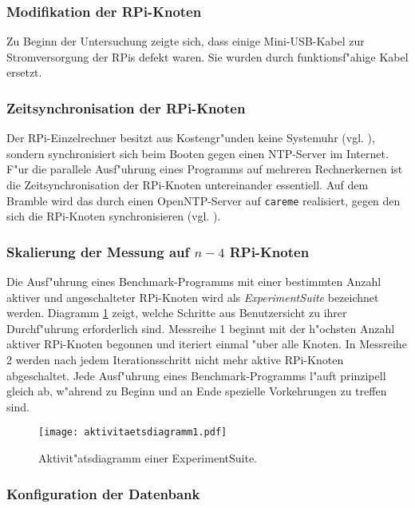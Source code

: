 \subsubsection{Modifikation der RPi-Knoten}

Zu Beginn der Untersuchung zeigte sich, dass einige Mini-USB-Kabel zur Stromversorgung der RPis defekt waren. Sie wurden durch funktionsf"ahige Kabel ersetzt. 

\subsubsection{Zeitsynchronisation der RPi-Knoten} 

Der RPi-Einzelrechner besitzt aus Kostengr"unden keine Systemuhr (vgl. \cite{schmi13}), sondern synchronisiert sich beim Booten gegen einen NTP-Server im Internet. F"ur die parallele Ausf"uhrung eines Programms auf mehreren Rechnerkernen ist die Zeitsynchronisation der RPi-Knoten untereinander essentiell. Auf dem Bramble wird das durch einen OpenNTP-Server auf \texttt{careme} realisiert, gegen den sich die RPi-Knoten synchronisieren (vgl. \cite{kli13}). 

\subsubsection{Skalierung der Messung auf $n-4$ RPi-Knoten} 

Die Ausf"uhrung eines Benchmark-Programms mit einer bestimmten Anzahl aktiver und angeschalteter RPi-Knoten wird als \textit{ExperimentSuite} bezeichnet werden. Diagramm \ref{fig:Aktivitaetsdiagramm} zeigt, welche Schritte aus Benutzersicht zu ihrer Durchf"uhrung erforderlich sind. Messreihe 1 beginnt mit der h"ochsten Anzahl aktiver RPi-Knoten begonnen und iteriert einmal "uber alle Knoten. In Messreihe 2 werden nach jedem Iterationsschritt nicht mehr aktive RPi-Knoten abgeschaltet. Jede Ausf"uhrung eines Benchmark-Programms l"auft prinzipell gleich ab, w"ahrend zu Beginn und an Ende spezielle Vorkehrungen zu treffen sind.  
\begin{figure}[htb]
  \centerline{\texttt{[image: aktivitaetsdiagramm1.pdf]}} 
  \caption{Aktivit"atsdiagramm einer ExperimentSuite.}
  \label{fig:Aktivitaetsdiagramm}
\end{figure}

\subsubsection{Konfiguration der Datenbank}

